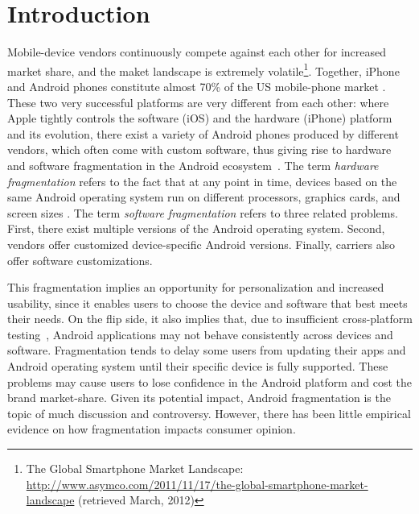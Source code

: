 \documentclass[10pt, conference, compsocconf]{IEEEtran}
\begin{document}
\section{Introduction}

Mobile-device vendors continuously compete against each other for
increased market share, and the maket landscape is extremely
volatile\footnote{The Global Smartphone Market Landscape:
  \url{http://www.asymco.com/2011/11/17/the-global-smartphone-market-landscape}
  (retrieved March, 2012)}. Together, iPhone and Android phones
constitute almost 70\% of the US mobile-phone market
\cite{usmarket}. These two very successful platforms are very
different from each other: where Apple tightly controls the software
(iOS) and the hardware (iPhone) platform and its evolution, there
exist a variety of Android phones produced by different vendors, which
often come with custom software, thus giving rise to hardware and
software fragmentation in the Android ecosystem~\cite{analysis}. The
term {\em hardware fragmentation} refers to the fact that at any point
in time, devices based on the same Android operating system run on
different processors, graphics cards, and screen sizes
\cite{analysis}. The term {\em software fragmentation} refers to three
related problems. First, there exist multiple versions of the Android
operating system. Second, vendors offer customized device-specific
Android versions. Finally, carriers also offer software
customizations.

This fragmentation implies an opportunity for personalization and
increased usability, since it enables users to choose the device and
software that best meets their needs. On the flip side, it also
implies that, due to insufficient cross-platform
testing~\cite{testing}, Android applications may not behave
consistently across devices and software.  
Fragmentation tends to delay some users from updating their apps
and Android operating system until their specific device is fully supported.
These problems
may cause users to lose confidence in the Android platform and cost
the brand market-share. Given its potential impact, Android
fragmentation is the topic of much discussion and
controversy. However, there has been little empirical evidence on how
fragmentation impacts consumer opinion.
\end{document}
